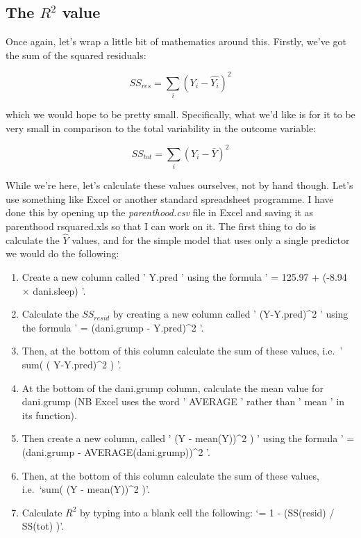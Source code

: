 \documentclass[
  a4paper,
]{book}
\providecommand{\tightlist}{%
  \setlength{\itemsep}{0pt}\setlength{\parskip}{0pt}}\usepackage{longtable,booktabs,array}
\begin{document}
\hypertarget{sec-The-R2-value}{%
\subsection{\texorpdfstring{The \(R^2\)
value}{The R\^{}2 value}}\label{sec-The-R2-value}}

Once again, let's wrap a little bit of mathematics around this. Firstly,
we've got the sum of the squared residuals:

\[SS_{res}=\sum_i (Y_i-\hat{Y_i})^2\]

which we would hope to be pretty small. Specifically, what we'd like is
for it to be very small in comparison to the total variability in the
outcome variable:

\[SS_{tot}=\sum_i(Y_i-\bar{Y})^2\]

While we're here, let's calculate these values ourselves, not by hand
though. Let's use something like Excel or another standard spreadsheet
programme. I have done this by opening up the \emph{parenthood.csv} file
in Excel and saving it as parenthood rsquared.xls so that I can work on
it. The first thing to do is calculate the \(\hat{Y}\) values, and for
the simple model that uses only a single predictor we would do the
following:

\begin{enumerate}
\def\labelenumi{\arabic{enumi}.}
\tightlist
\item
  Create a new column called ' Y.pred ' using the formula ' = 125.97 +
  (-8.94 \(\times\) dani.sleep) '.
\item
  Calculate the \(SS_{resid}\) by creating a new column called '
  (Y-Y.pred)\^{}2 ' using the formula ' = (dani.grump - Y.pred)\^{}2 '.
\item
  Then, at the bottom of this column calculate the sum of these values,
  i.e.~' sum( ( Y-Y.pred)\^{}2 ) '.
\item
  At the bottom of the dani.grump column, calculate the mean value for
  dani.grump (NB Excel uses the word ' AVERAGE ' rather than ' mean ' in
  its function).
\item
  Then create a new column, called ' (Y - mean(Y))\^{}2 ) ' using the
  formula ' = (dani.grump - AVERAGE(dani.grump))\^{}2 '.
\item
  Then, at the bottom of this column calculate the sum of these values,
  i.e.~`sum( (Y - mean(Y))\^{}2 )'.
\item
  Calculate \(R^2\) by typing into a blank cell the following: `= 1 -
  (SS(resid) / SS(tot) )'.
\end{enumerate}
\end{document}
